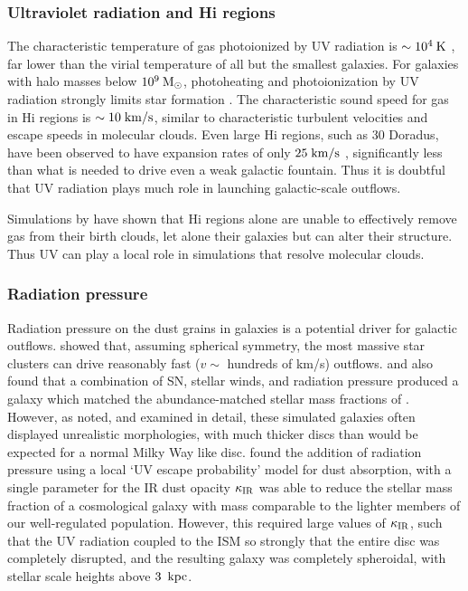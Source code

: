 \subsubsection{Ultraviolet radiation and {\sc Hi} regions}
The characteristic temperature of gas photoionized by UV radiation is
$\sim10^{4}\>{\rm K}$ \citep{Krumholz2009}, far lower than the virial temperature
of all but the smallest galaxies.  For galaxies with halo masses below
$10^9\>{\rm M_{\odot}}$, photoheating and photoionization by UV radiation strongly limits star
formation \citep{Efstathiou1992}.  The characteristic sound speed for gas in {\sc Hi}
regions is $\sim10\;\rm{km/s}$, similar to characteristic turbulent velocities
and escape speeds in molecular clouds.  Even large {\sc Hi} regions, such as 30
Doradus, have been observed to have expansion rates of only $25\;\rm{km/s}$
\citep{Chu1994}, significantly less than what is needed to drive even a weak
galactic fountain.  Thus it is doubtful that UV radiation plays much role in
launching galactic-scale outflows.  

Simulations by \citet{Dale2012} have shown that {\sc Hi} regions alone are unable to
effectively remove gas from their birth clouds, let alone their galaxies but can
alter their structure.  Thus UV can play a local role in simulations that
resolve molecular clouds.

\subsubsection{Radiation pressure}
Radiation pressure on the dust grains in galaxies is a potential driver for
galactic outflows.  \citet{Murray2011} showed that, assuming spherical symmetry,
the most massive star clusters can drive reasonably fast ($v\sim$ hundreds of
km/s) outflows.  \citet{Agertz2015} and \citet{Hopkins2014} also found that a
combination of SN, stellar winds, and radiation pressure produced a galaxy which
matched the abundance-matched stellar mass fractions of \citet{Behroozi2013}.
However, as \citet{Agertz2015} noted, and \citet{Roskar2014} examined in detail,
these simulated galaxies often displayed unrealistic morphologies, with much
thicker discs than would be expected for a normal Milky Way like disc.
\citet{Roskar2014} found the addition of radiation pressure using a local `UV
escape probability' model for dust absorption, with a single parameter for the
IR dust opacity $\kappa_{\rm IR}$ was able to reduce the stellar mass fraction of a
cosmological galaxy with mass comparable to the lighter members of our
well-regulated population.  However, this required large values of
$\kappa_{\rm IR}$, such that the UV radiation coupled to the ISM so strongly that
the entire disc was completely disrupted, and the resulting galaxy was
completely spheroidal, with stellar scale heights above $3\;\>{\rm kpc}$.

